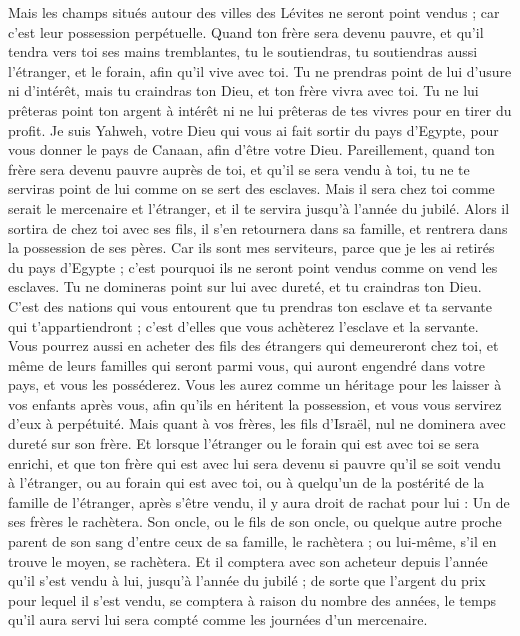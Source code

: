 \begin{multicols}{2}
Mais les champs situés autour des villes des Lévites ne seront point vendus ; car c'est leur possession perpétuelle.
Quand ton frère sera devenu pauvre, et qu'il tendra vers toi ses mains tremblantes, tu le soutiendras, tu soutiendras aussi l'étranger, et le forain, afin qu'il vive avec toi.
Tu ne prendras point de lui d'usure ni d'intérêt, mais tu craindras ton Dieu, et ton frère vivra avec toi.
Tu ne lui prêteras point ton argent à intérêt ni ne lui prêteras de tes vivres pour en tirer du profit.
Je suis Yahweh, votre Dieu qui vous ai fait sortir du pays d'Egypte, pour vous donner le pays de Canaan, afin d'être votre Dieu.
Pareillement, quand ton frère sera devenu pauvre auprès de toi, et qu'il se sera vendu à toi, tu ne te serviras point de lui comme on se sert des esclaves.
Mais il sera chez toi comme serait le mercenaire et l'étranger, et il te servira jusqu'à l'année du jubilé.
Alors il sortira de chez toi avec ses fils, il s'en retournera dans sa famille, et rentrera dans la possession de ses pères.
Car ils sont mes serviteurs, parce que je les ai retirés du pays d'Egypte ; c'est pourquoi ils ne seront point vendus comme on vend les esclaves.
Tu ne domineras point sur lui avec dureté, et tu craindras ton Dieu.
C'est des nations qui vous entourent que tu prendras ton esclave et ta servante qui t'appartiendront ; c'est d'elles que vous achèterez l'esclave et la servante.
Vous pourrez aussi en acheter des fils des étrangers qui demeureront chez toi, et même de leurs familles qui seront parmi vous, qui auront engendré dans votre pays, et vous les posséderez.
Vous les aurez comme un héritage pour les laisser à vos enfants après vous, afin qu'ils en héritent la possession, et vous vous servirez d'eux à perpétuité. Mais quant à vos frères, les fils d'Israël, nul ne dominera avec dureté sur son frère.
Et lorsque l'étranger ou le forain qui est avec toi se sera enrichi, et que ton frère qui est avec lui sera devenu si pauvre qu'il se soit vendu à l'étranger, ou au forain qui est avec toi, ou à quelqu'un de la postérité de la famille de l'étranger,
après s'être vendu, il y aura droit de rachat pour lui : Un de ses frères le rachètera.
Son oncle, ou le fils de son oncle, ou quelque autre proche parent de son sang d'entre ceux de sa famille, le rachètera ; ou lui-même, s'il en trouve le moyen, se rachètera.
Et il comptera avec son acheteur depuis l'année qu'il s'est vendu à lui, jusqu'à l'année du jubilé ; de sorte que l'argent du prix pour lequel il s'est vendu, se comptera à raison du nombre des années, le temps qu'il aura servi lui sera compté comme les journées d'un mercenaire.

\end{multicols}
